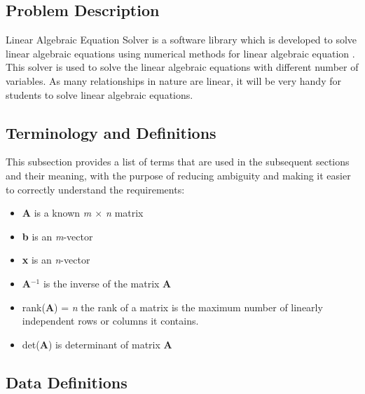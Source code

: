 \documentclass[12pt]{article}
\newcommand{\progname}{Linear Algebraic Equation Solver} %
\begin{document}
\subsection{Problem Description} \label{Sec_pd}

\progname{} is a software library which is developed to solve linear algebraic equations using numerical methods for linear algebraic equation . This solver is used to solve the linear algebraic equations with different number of variables. As many relationships in nature are linear, it will be very handy for
students to solve linear algebraic equations.

\subsection{Terminology and  Definitions}

This subsection provides a list of terms that are used in the subsequent
sections and their meaning, with the purpose of reducing ambiguity and making it
easier to correctly understand the requirements:




\begin{itemize}

\item \textbf{A} is a known \textit{m $\times$ n} matrix 

\item \textbf{b} is an \textit{m}-vector 

\item \textbf{x} is an \textit{n}-vector

\item \textbf{A$^{-1}$} is the inverse of the matrix \textbf{A}

\item rank(\textbf{A}) = \textit{n} the rank of a matrix is the maximum number
of linearly independent rows or columns it contains.

\item det(\textbf{A}) is determinant of matrix \textbf{A}


\end{itemize}

\pagebreak

\subsection{Data Definitions} \label{sec_datadef}

~\newline
\end{document}
